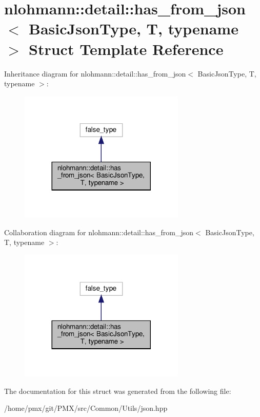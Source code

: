 \hypertarget{structnlohmann_1_1detail_1_1has__from__json}{}\section{nlohmann\+:\+:detail\+:\+:has\+\_\+from\+\_\+json$<$ Basic\+Json\+Type, T, typename $>$ Struct Template Reference}
\label{structnlohmann_1_1detail_1_1has__from__json}


Inheritance diagram for nlohmann\+:\+:detail\+:\+:has\+\_\+from\+\_\+json$<$ Basic\+Json\+Type, T, typename $>$\+:
\nopagebreak
\begin{figure}[H]
\begin{center}
\leavevmode
\includegraphics[width=224pt]{structnlohmann_1_1detail_1_1has__from__json__inherit__graph}
\end{center}
\end{figure}


Collaboration diagram for nlohmann\+:\+:detail\+:\+:has\+\_\+from\+\_\+json$<$ Basic\+Json\+Type, T, typename $>$\+:
\nopagebreak
\begin{figure}[H]
\begin{center}
\leavevmode
\includegraphics[width=224pt]{structnlohmann_1_1detail_1_1has__from__json__coll__graph}
\end{center}
\end{figure}


The documentation for this struct was generated from the following file\+:\begin{DoxyCompactItemize}
\item 
/home/pmx/git/\+P\+M\+X/src/\+Common/\+Utils/json.\+hpp\end{DoxyCompactItemize}
